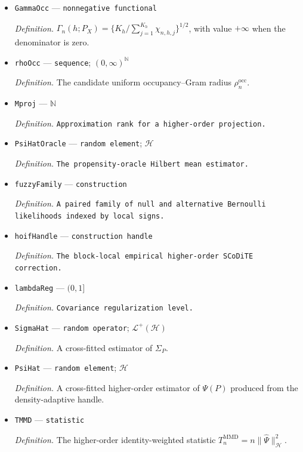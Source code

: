 \documentclass{article}
\begin{document}
\begin{itemize}
  \item \texttt{GammaOcc} --- \texttt{nonnegative functional}
  \par\smallskip\noindent\emph{Definition.} \(\Gamma_n(h;P_X)=\{K_h/\sum_{j=1}^{K_h}\chi_{n,h,j}\}^{1/2}\), with value \(+\infty\) when the denominator is zero.
  \item \texttt{rhoOcc} --- \texttt{sequence}; \((0,\infty)^{\mathbb N}\)
  \par\smallskip\noindent\emph{Definition.} The candidate uniform occupancy--Gram radius \(\rho_n^{\mathrm{occ}}\).
  \item \texttt{Mproj} --- \(\mathbb N\)
  \par\smallskip\noindent\emph{Definition.} \texttt{Approximation rank for a higher-\allowbreak{}order projection.}
  \item \texttt{PsiHatOracle} --- \texttt{random element}; \(\mathcal H\)
  \par\smallskip\noindent\emph{Definition.} \texttt{The propensity-\allowbreak{}oracle Hilbert mean estimator.}
  \item \texttt{fuzzyFamily} --- \texttt{construction}
  \par\smallskip\noindent\emph{Definition.} \texttt{A paired family of null and alternative Bernoulli likelihoods indexed by local signs.}
  \item \texttt{hoifHandle} --- \texttt{construction handle}
  \par\smallskip\noindent\emph{Definition.} \texttt{The block-\allowbreak{}local empirical higher-\allowbreak{}order SCoDiTE correction.}
  \item \texttt{lambdaReg} --- \((0,1]\)
  \par\smallskip\noindent\emph{Definition.} \texttt{Covariance regularization level.}
  \item \texttt{SigmaHat} --- \texttt{random operator}; \(\mathcal L^+(\mathcal H)\)
  \par\smallskip\noindent\emph{Definition.} A cross-fitted estimator of \(\Sigma_P\).
  \item \texttt{PsiHat} --- \texttt{random element}; \(\mathcal H\)
  \par\smallskip\noindent\emph{Definition.} A cross-fitted higher-order estimator of \(\Psi(P)\) produced from the density-adaptive handle.
  \item \texttt{TMMD} --- \texttt{statistic}
  \par\smallskip\noindent\emph{Definition.} The higher-order identity-weighted statistic \(T_n^{\mathrm{MMD}}=n\|\widehat\Psi\|_{\mathcal H}^{2}\).

\end{itemize}
\end{document}

